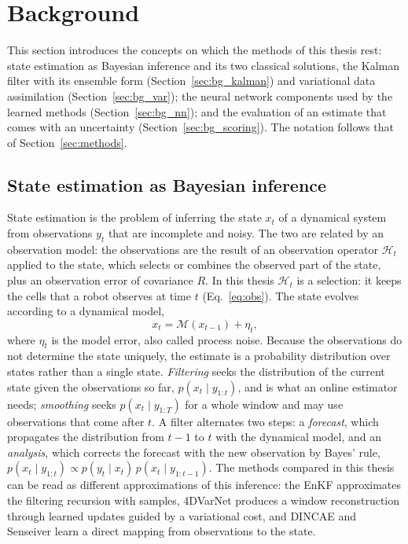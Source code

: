 \documentclass[english, 12pt, a4paper, elec, utf8, a-2b, online]{aaltothesis}
\begin{document}
\section{Background}
\label{sec:background}

This section introduces the concepts on which the methods of this thesis rest:
state estimation as Bayesian inference and its two classical solutions, the
Kalman filter with its ensemble form (Section~\ref{sec:bg_kalman}) and
variational data assimilation (Section~\ref{sec:bg_var}); the neural network
components used by the learned methods (Section~\ref{sec:bg_nn}); and the
evaluation of an estimate that comes with an uncertainty
(Section~\ref{sec:bg_scoring}). The notation follows that of
Section~\ref{sec:methods}.

\subsection{State estimation as Bayesian inference}
\label{sec:bg_bayes}

State estimation is the problem of inferring the state $x_t$ of a dynamical
system from observations $y_t$ that are incomplete and noisy. The two are
related by an observation model: the observations are the result of an
observation operator $\mathcal{H}_t$ applied to the state, which selects or
combines the observed part of the state, plus an observation error of
covariance $R$.
In this thesis $\mathcal{H}_t$ is a selection: it keeps the cells that a robot
observes at time $t$ (Eq.~\eqref{eq:obs}). The state evolves according to a
dynamical model,
\begin{equation}
	x_t = \mathcal{M}(x_{t-1}) + \eta_t,
	\label{eq:bg_dyn}
\end{equation}
where $\eta_t$ is the model error, also called process noise. Because the
observations do not determine the state uniquely, the estimate is a probability
distribution over states rather than a single state. \emph{Filtering} seeks the
distribution of the current state given the observations so far,
$p(x_t \mid y_{1:t})$, and is what an online estimator needs;
\emph{smoothing} seeks $p(x_t \mid y_{1:T})$ for a whole window and may use
observations that come after $t$. A filter alternates two steps: a
\emph{forecast}, which propagates the distribution from $t-1$ to $t$ with the
dynamical model, and an \emph{analysis}, which corrects the forecast with the
new observation by Bayes' rule,
$p(x_t \mid y_{1:t}) \propto p(y_t \mid x_t)\, p(x_t \mid y_{1:t-1})$. The
methods compared in this thesis can be read as different approximations of this
inference: the EnKF approximates the filtering recursion with samples,
4DVarNet produces a window reconstruction through learned updates guided by a
variational cost, and DINCAE and Senseiver learn a direct mapping from
observations to the state.
\end{document}
